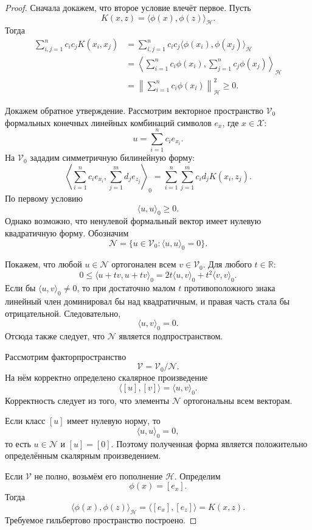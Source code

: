 \documentclass[12pt,a4paper]{article}
\theoremstyle{definition}
\newcommand{\R}{\mathbb{R}}
\newcommand{\1}{\mathbf{1}}
\begin{document}
\begin{proof}
Сначала докажем, что второе условие влечёт первое. Пусть
\[
    K(x,z)
    =
    \langle\phi(x),\phi(z)\rangle_{\mathcal{H}}.
\]
Тогда
\begin{align*}
    \sum_{i,j=1}^{n}c_ic_jK(x_i,x_j)
    &=
    \sum_{i,j=1}^{n}
    c_ic_j
    \langle\phi(x_i),\phi(x_j)\rangle_{\mathcal{H}}\\
    &=
    \left\langle
        \sum_{i=1}^{n}c_i\phi(x_i),
        \sum_{j=1}^{n}c_j\phi(x_j)
    \right\rangle_{\mathcal{H}}\\
    &=
    \left\|
        \sum_{i=1}^{n}c_i\phi(x_i)
    \right\|_{\mathcal{H}}^2
    \geq0.
\end{align*}

Докажем обратное утверждение. Рассмотрим векторное пространство
$\mathcal{V}_0$ формальных конечных линейных комбинаций символов
$e_x$, где $x\in\mathcal{X}$:
\[
    u=\sum_{i=1}^{n}c_ie_{x_i}.
\]
На $\mathcal{V}_0$ зададим симметричную билинейную форму:
\[
    \left\langle
        \sum_{i=1}^{n}c_ie_{x_i},
        \sum_{j=1}^{m}d_je_{z_j}
    \right\rangle_0
    =
    \sum_{i=1}^{n}
    \sum_{j=1}^{m}
    c_id_jK(x_i,z_j).
\]
По первому условию
\[
    \langle u,u\rangle_0\geq0.
\]
Однако возможно, что ненулевой формальный вектор имеет нулевую
квадратичную форму. Обозначим
\[
    \mathcal{N}
    =
    \{u\in\mathcal{V}_0:
      \langle u,u\rangle_0=0\}.
\]

Покажем, что любой $u\in\mathcal{N}$ ортогонален всем
$v\in\mathcal{V}_0$. Для любого $t\in\R$:
\[
    0
    \leq
    \langle u+tv,u+tv\rangle_0
    =
    2t\langle u,v\rangle_0
    +
    t^2\langle v,v\rangle_0.
\]
Если бы $\langle u,v\rangle_0\neq0$, то при достаточно малом $t$
противоположного знака линейный член доминировал бы над квадратичным,
и правая часть стала бы отрицательной. Следовательно,
\[
    \langle u,v\rangle_0=0.
\]
Отсюда также следует, что $\mathcal{N}$ является подпространством.

Рассмотрим факторпространство
\[
    \mathcal{V}
    =
    \mathcal{V}_0/\mathcal{N}.
\]
На нём корректно определено скалярное произведение
\[
    \langle[u],[v]\rangle
    =
    \langle u,v\rangle_0.
\]
Корректность следует из того, что элементы $\mathcal{N}$
ортогональны всем векторам.

Если класс $[u]$ имеет нулевую норму, то
\[
    \langle u,u\rangle_0=0,
\]
то есть $u\in\mathcal{N}$ и $[u]=[0]$. Поэтому полученная форма является
положительно определённым скалярным произведением.

Если $\mathcal{V}$ не полно, возьмём его пополнение $\mathcal{H}$.
Определим
\[
    \phi(x)=[e_x].
\]
Тогда
\[
    \langle\phi(x),\phi(z)\rangle_{\mathcal{H}}
    =
    \langle[e_x],[e_z]\rangle
    =
    K(x,z).
\]
Требуемое гильбертово пространство построено.
\end{proof}
\end{document}
